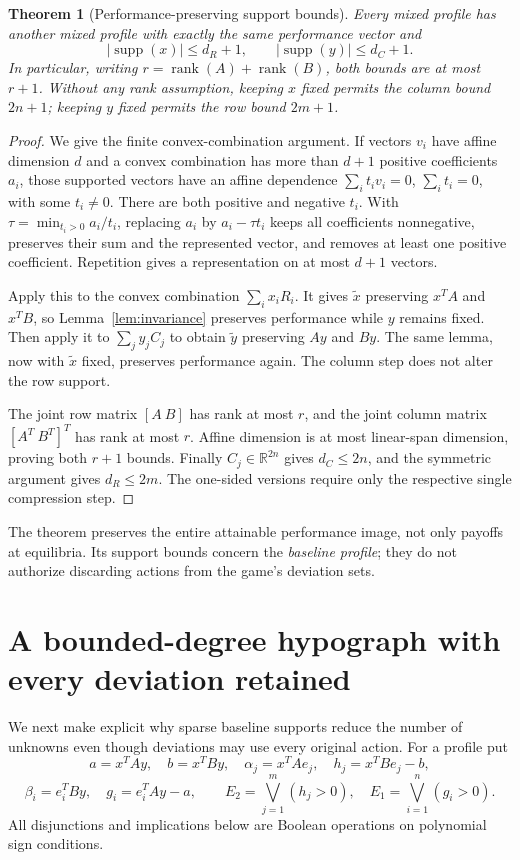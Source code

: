 \documentclass[11pt]{article}
\newtheorem{theorem}{Theorem}
\theoremstyle{remark}
\newcommand{\R}{\mathbb R}
\newcommand{\supp}{\operatorname{supp}}
\newcommand{\rank}{\operatorname{rank}}
\begin{document}
\begin{theorem}[Performance-preserving support bounds]\label{thm:compression}
Every mixed profile has another mixed profile with exactly the same performance vector and
\[
 |\supp(x)|\le d_R+1,\qquad |\supp(y)|\le d_C+1.
\]
In particular, writing $r=\rank(A)+\rank(B)$, both bounds are at most $r+1$. Without any rank assumption, keeping $x$ fixed permits the column bound $2n+1$; keeping $y$ fixed permits the row bound $2m+1$.
\end{theorem}
\begin{proof}
We give the finite convex-combination argument. If vectors $v_i$ have affine dimension $d$ and a convex combination has more than $d+1$ positive coefficients $a_i$, those supported vectors have an affine dependence
$\sum_i t_i v_i=0$, $\sum_i t_i=0$, with some $t_i\ne0$.
There are both positive and negative $t_i$. With
$\tau=\min_{t_i>0} a_i/t_i$, replacing $a_i$ by $a_i-\tau t_i$ keeps all coefficients nonnegative, preserves their sum and the represented vector, and removes at least one positive coefficient. Repetition gives a representation on at most $d+1$ vectors.

Apply this to the convex combination $\sum_i x_iR_i$. It gives $\widetilde x$ preserving $x^TA$ and $x^TB$, so Lemma~\ref{lem:invariance} preserves performance while $y$ remains fixed. Then apply it to $\sum_jy_jC_j$ to obtain $\widetilde y$ preserving $Ay$ and $By$. The same lemma, now with $\widetilde x$ fixed, preserves performance again. The column step does not alter the row support.

The joint row matrix $[A\ B]$ has rank at most $r$, and the joint column matrix $[A^T\ B^T]^T$ has rank at most $r$. Affine dimension is at most linear-span dimension, proving both $r+1$ bounds. Finally $C_j\in\R^{2n}$ gives $d_C\le2n$, and the symmetric argument gives $d_R\le2m$. The one-sided versions require only the respective single compression step.
\end{proof}

The theorem preserves the entire attainable performance image, not only payoffs at equilibria. Its support bounds concern the \emph{baseline profile}; they do not authorize discarding actions from the game's deviation sets.

\section{A bounded-degree hypograph with every deviation retained}
We next make explicit why sparse baseline supports reduce the number of unknowns even though deviations may use every original action. For a profile put
\[
 a=x^TAy,\quad b=x^TBy,\quad
 \alpha_j=x^TAe_j,\quad h_j=x^TBe_j-b,
\]
\[
 \beta_i=e_i^TBy,\quad g_i=e_i^TAy-a,
 \qquad E_2=\bigvee_{j=1}^m(h_j>0),\quad
 E_1=\bigvee_{i=1}^n(g_i>0).
\]
All disjunctions and implications below are Boolean operations on polynomial sign conditions.
\end{document}
